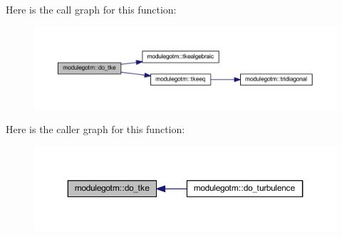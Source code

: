 Here is the call graph for this function\+:\nopagebreak
\begin{figure}[H]
\begin{center}
\leavevmode
\includegraphics[width=350pt]{namespacemodulegotm_ae39109acd910c29deba62e83a6edce50_cgraph}
\end{center}
\end{figure}
Here is the caller graph for this function\+:\nopagebreak
\begin{figure}[H]
\begin{center}
\leavevmode
\includegraphics[width=350pt]{namespacemodulegotm_ae39109acd910c29deba62e83a6edce50_icgraph}
\end{center}
\end{figure}
\mbox{\label{namespacemodulegotm_a4ca35153e188114f4f02fe276d302d14}} 
